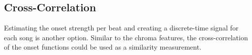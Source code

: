\subsection{Cross-Correlation}

Estimating the onset strength per beat and creating a discrete-time signal for each song is another option. Similar to the chroma features, the cross-correlation of the onset functions could be used as a similarity measurement. 

\begin{figure}[htbp]
	\centering
\end{figure}
